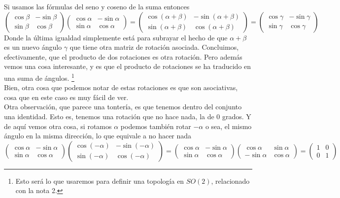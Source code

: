 \documentclass[12pt]{article}
\begin{document}
Si usamos las fórmulas del seno y coseno de la suma entonces 
\begin{equation*}
      \begin{pmatrix}
        \cos \beta & -\sin\beta \\ \sin\beta & \cos \beta
    \end{pmatrix} \begin{pmatrix}
        \cos \alpha & -\sin\alpha\\ \sin\alpha & \cos \alpha
    \end{pmatrix} =\begin{pmatrix}
        \cos (\alpha +\beta) & -\sin(\alpha +\beta)\\ \sin(\alpha +\beta) & \cos (\alpha +\beta)
    \end{pmatrix} =\begin{pmatrix}
        \cos \gamma & -\sin \gamma \\ \sin \gamma & \cos\gamma
    \end{pmatrix}
\end{equation*}
Donde la última igualdad simplemente está para subrayar el hecho de que $\alpha+\beta$ es un nuevo ángulo $\gamma$ que tiene otra matriz de rotación asociada. Concluimos, efectivamente, que el producto de dos rotaciones es otra rotación. Pero además vemos una cosa interesante, y es que el producto de rotaciones se ha traducido en una suma de ángulos. \footnote{Esto será lo que usaremos para definir una topología en $SO(2)$, relacionado con la nota 2. }\\
Bien, otra cosa que podemos notar de estas rotaciones es que son asociativas, cosa que en este caso es muy fácil de ver. \\
Otra observación, que parece una tontería, es que tenemos dentro del conjunto una identidad. Esto es, tenemos una rotación que no hace nada, la de $0$ grados. Y de aquí vemos otra cosa, si rotamos $\alpha$ podemos también rotar $-\alpha$ o sea, el mismo ángulo en la misma dirección, lo que equivale a no hacer nada
\begin{equation*}
    \begin{pmatrix}
         \cos \alpha & -\sin\alpha\\ \sin\alpha & \cos \alpha  
    \end{pmatrix} \begin{pmatrix}
         \cos (-\alpha) & -\sin(-\alpha)\\ \sin(-\alpha) & \cos (-\alpha)
    \end{pmatrix} = \begin{pmatrix}
         \cos \alpha & -\sin\alpha\\ \sin\alpha & \cos \alpha  
    \end{pmatrix}   \begin{pmatrix}
        \cos \alpha & \sin\alpha\\ -\sin\alpha & \cos \alpha
    \end{pmatrix} =\begin{pmatrix}
        1 & 0 \\ 0 & 1
    \end{pmatrix}
\end{equation*}
\end{document}
